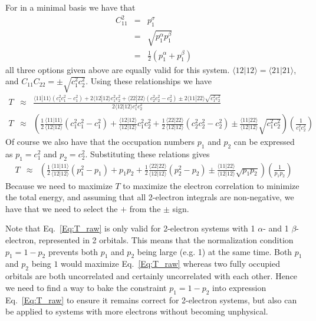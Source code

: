 \documentclass[pra]{revtex4-1}
\begin{document}
For  in a minimal basis we have that 
\begin{eqnarray}
C_{11}^2 &=& p_{1}^\sigma \\
         &=& \sqrt{p_1^\alpha p_1^\beta} \\
         &=& \frac{1}{2}\left(p_1^\alpha + p_1^\beta\right)
\end{eqnarray}
all three options given above are equally valid for this system.
$\langle 12|12 \rangle = \langle 21|21 \rangle$, and
$C_{11}C_{22} = \pm \sqrt{c_1^2c_2^2}$. Using these relationships
we have
\begin{eqnarray}
  T &\approx& \frac{
             \langle 11|11 \rangle \left(c_1^2c_1^2-c_1^2\right)
         + 2 \langle 12|12 \rangle c_1^2c_2^2
         +   \langle 22|22 \rangle \left(c_2^2c_2^2-c_2^2\right)
         \pm 2 \langle 11|22 \rangle \sqrt{c_1^2c_2^2}
        }{
         2 \langle 12|12 \rangle c_1^2c_2^2
       } \\
  T &\approx&
         \left(
           \frac{1}{2}\frac{\langle 11|11 \rangle}{\langle 12|12 \rangle} \left(c_1^2c_1^2-c_1^2\right)
         + \frac{\langle 12|12 \rangle}{\langle 12|12 \rangle} c_1^2c_2^2
         + \frac{1}{2}\frac{\langle 22|22 \rangle}{\langle 12|12 \rangle} \left(c_2^2c_2^2-c_2^2\right)
         \pm \frac{\langle 11|22 \rangle}{\langle 12|12 \rangle} \sqrt{c_1^2c_2^2}
         \right)\left(\frac{1}{c_1^2c_2^2}\right)
\end{eqnarray}
Of course we also have that the occupation numbers $p_1$ and $p_2$ can be expressed as
$p_1 = c_1^2$ and $p_2 = c_2^2$. Substituting these relations gives
\begin{eqnarray}
  T &\approx&
         \left(
           \frac{1}{2}\frac{\langle 11|11 \rangle}{\langle 12|12 \rangle} \left(p_1^2-p_1\right)
         + p_1 p_2
         + \frac{1}{2}\frac{\langle 22|22 \rangle}{\langle 12|12 \rangle} \left(p_2^2-p_2\right)
         \pm \frac{\langle 11|22 \rangle}{\langle 12|12 \rangle} \sqrt{p_1 p_2}
         \right)\left(\frac{1}{p_1 p_2}\right)
         \label{Eq:T_raw}
\end{eqnarray}
Because we need to maximize $T$ to maximize the electron correlation to minimize the total energy,
and assuming that all 2-electron integrals are non-negative, we have that we need to select
the $+$ from the $\pm$ sign.

Note that Eq.~\ref{Eq:T_raw} is only valid for 2-electron systems with 1 $\alpha$- and 1
$\beta$-electron, represented in 2 orbitals. This means that the normalization condition
$p_1=1-p_2$ prevents both $p_1$ and $p_2$ being large (e.g. 1) at the same time. Both $p_1$ and
$p_2$ being $1$ would maximize Eq.~\ref{Eq:T_raw} whereas two fully occupied orbitals are
both uncorrelated and certainly uncorrelated with each other. Hence we need to find a way to
bake the constraint $p_1=1-p_2$ into expression Eq.~\ref{Eq:T_raw} to ensure it remains correct
for 2-electron systems, but also can be applied to systems with more electrons without 
becoming unphysical.
\end{document}
